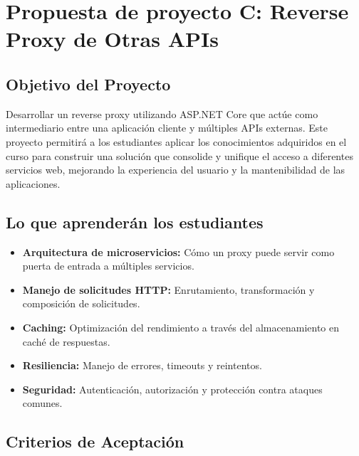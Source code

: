 \documentclass[
]{agujournal2019}
\begin{document}
\section{Propuesta de proyecto C: Reverse Proxy de Otras
APIs}\label{propuesta-de-proyecto-c-reverse-proxy-de-otras-apis}

\subsection{Objetivo del Proyecto}\label{objetivo-del-proyecto-1}

Desarrollar un reverse proxy utilizando ASP.NET Core que actúe como
intermediario entre una aplicación cliente y múltiples APIs externas.
Este proyecto permitirá a los estudiantes aplicar los conocimientos
adquiridos en el curso para construir una solución que consolide y
unifique el acceso a diferentes servicios web, mejorando la experiencia
del usuario y la mantenibilidad de las aplicaciones.

\subsection{Lo que aprenderán los
estudiantes}\label{lo-que-aprenderuxe1n-los-estudiantes-1}

\begin{itemize}
\item
  \textbf{Arquitectura de microservicios:} Cómo un proxy puede servir
  como puerta de entrada a múltiples servicios.
\item
  \textbf{Manejo de solicitudes HTTP:} Enrutamiento, transformación y
  composición de solicitudes.
\item
  \textbf{Caching:} Optimización del rendimiento a través del
  almacenamiento en caché de respuestas.
\item
  \textbf{Resiliencia:} Manejo de errores, timeouts y reintentos.
\item
  \textbf{Seguridad:} Autenticación, autorización y protección contra
  ataques comunes.
\end{itemize}

\subsection{Criterios de Aceptación}\label{criterios-de-aceptaciuxf3n-1}
\end{document}
